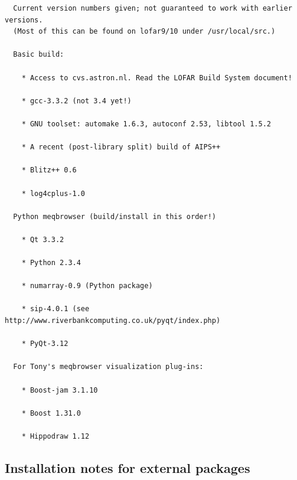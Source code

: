 \documentclass[10pt]{article}
\begin{document}
\begin{verbatim}
  Current version numbers given; not guaranteed to work with earlier versions.
  (Most of this can be found on lofar9/10 under /usr/local/src.)

  Basic build:

    * Access to cvs.astron.nl. Read the LOFAR Build System document!

    * gcc-3.3.2 (not 3.4 yet!)

    * GNU toolset: automake 1.6.3, autoconf 2.53, libtool 1.5.2

    * A recent (post-library split) build of AIPS++

    * Blitz++ 0.6

    * log4cplus-1.0 

  Python meqbrowser (build/install in this order!)

    * Qt 3.3.2

    * Python 2.3.4

    * numarray-0.9 (Python package)

    * sip-4.0.1 (see http://www.riverbankcomputing.co.uk/pyqt/index.php)

    * PyQt-3.12

  For Tony's meqbrowser visualization plug-ins:

    * Boost-jam 3.1.10

    * Boost 1.31.0

    * Hippodraw 1.12
\end{verbatim}
  
\subsection{Installation notes for external packages}
\end{document}
